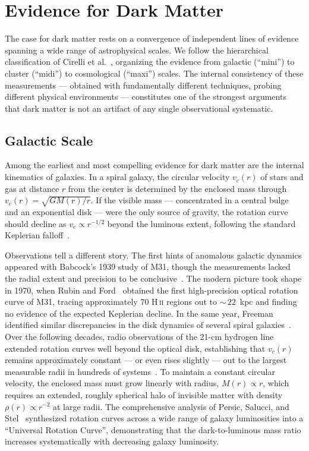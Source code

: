 
\section{Evidence for Dark Matter}
\label{sec:1.1}
The case for dark matter rests on a convergence of independent lines of evidence spanning a wide range of astrophysical scales.
We follow the hierarchical classification of Cirelli et al.~\cite{Cirelli:2024ssz}, organizing the evidence from galactic (``mini'') to cluster (``midi'') to cosmological (``maxi'') scales.
The internal consistency of these measurements --- obtained with fundamentally different techniques, probing different physical environments --- constitutes one of the strongest arguments that dark matter is not an artifact of any single observational systematic.

\subsection{Galactic Scale}
\label{sec:1.1.1}

Among the earliest and most compelling evidence for dark matter are the internal kinematics of galaxies.
In a spiral galaxy, the circular velocity $v_c(r)$ of stars and gas at distance $r$ from the center is determined by the enclosed mass through $v_c(r) = \sqrt{GM(r)/r}$.
If the visible mass --- concentrated in a central bulge and an exponential disk --- were the only source of gravity, the rotation curve should decline as $v_c \propto r^{-1/2}$ beyond the luminous extent, following the standard Keplerian falloff~\cite{Cirelli:2024ssz}.

Observations tell a different story.
The first hints of anomalous galactic dynamics appeared with Babcock's 1939 study of M31, though the measurements lacked the radial extent and precision to be conclusive~\cite{Babcock:1939}.
The modern picture took shape in 1970, when Rubin and Ford~\cite{Rubin:1970zza} obtained the first high-precision optical rotation curve of M31, tracing approximately 70 H\,\textsc{ii} regions out to ${\sim}\,22$~kpc and finding no evidence of the expected Keplerian decline.
In the same year, Freeman identified similar discrepancies in the disk dynamics of several spiral galaxies~\cite{Freeman:1970}.
Over the following decades, radio observations of the 21-cm hydrogen line extended rotation curves well beyond the optical disk, establishing that $v_c(r)$ remains approximately constant --- or even rises slightly --- out to the largest measurable radii in hundreds of systems~\cite{Rubin:1980zd,Bosma:1981zz}.
To maintain a constant circular velocity, the enclosed mass must grow linearly with radius, $M(r) \propto r$, which requires an extended, roughly spherical halo of invisible matter with density $\rho(r) \propto r^{-2}$ at large radii.
The comprehensive analysis of Persic, Salucci, and Stel~\cite{Persic:1995ru} synthesized rotation curves across a wide range of galaxy luminosities into a ``Universal Rotation Curve'', demonstrating that the dark-to-luminous mass ratio increases systematically with decreasing galaxy luminosity.

